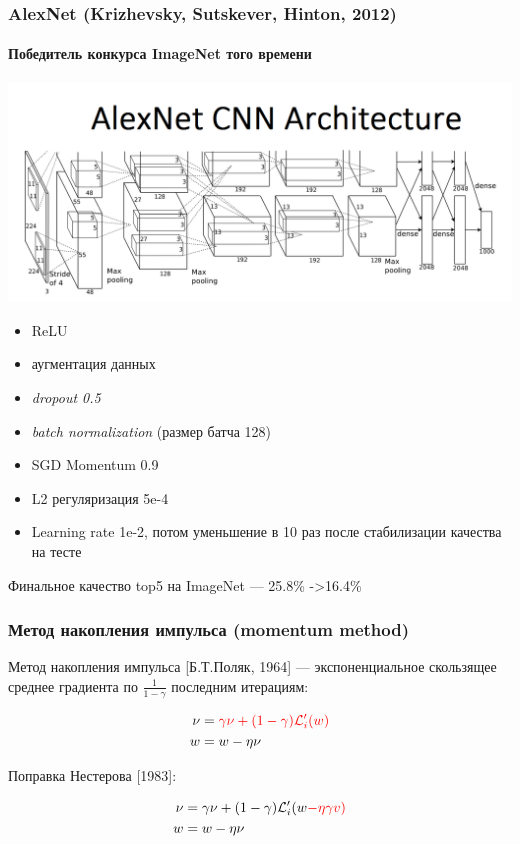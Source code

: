 \documentclass[fullscreen=true, bookmarks=true, hyperref={pdfencoding=unicode}]{beamer}
\begin{document}
\begin{frame}
  \frametitle{AlexNet (Krizhevsky, Sutskever, Hinton, 2012)}
  \framesubtitle{Победитель конкурса ImageNet того времени}
  \begin{center}
    \includegraphics[keepaspectratio,
                     width=0.5\paperwidth]{AlexNetCNN.png}
  \end{center}
  \begin{itemize}
    \item ReLU
    \item аугментация данных
    \item {\it dropout 0.5}
    \item {\it batch normalization} (размер батча 128)
    \item SGD Momentum 0.9
    \item L2 регуляризация 5e-4
    \item Learning rate 1e-2, потом уменьшение в 10 раз после стабилизации качества на тесте
  \end{itemize}

    Финальное качество top5 на ImageNet — 25.8\% ->16.4\%
\end{frame}

\begin{frame}
  \frametitle{Метод накопления импульса (momentum method)}
  Метод накопления импульса [Б.Т.Поляк, 1964] — экспоненциальное скользящее среднее градиента по $\frac{1}{1-\gamma}$ последним итерациям:

  \begin{align*}
    \nu &= \color{red}{\gamma} \nu + \color{red}{(1-\gamma)} \mathcal{L}_i^\prime(w) \\
      w &= w - \eta \nu
  \end{align*}

  Поправка Нестерова [1983]:

  \begin{align*}
    \nu &= \gamma \nu + (1 - \gamma) \mathcal{L}_i^\prime(w \color{red}{- \eta \gamma v}) \\
      w &= w - \eta \nu
  \end{align*}

\end{frame}
\end{document}
